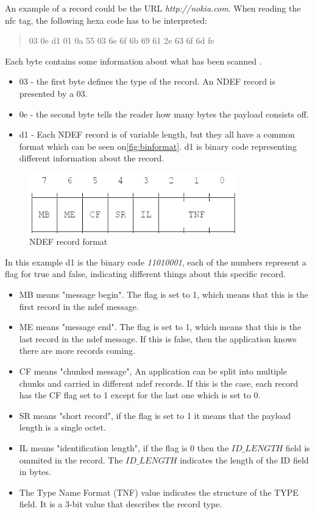 An example of a record could be the URL \textit{http://nokia.com}. When reading the \ac{nfc} tag, the following hexa code has to be interpreted: 

\begin{quote}
03 0e d1 01 0a 55 03 6e 6f 6b 69 61 2e 63 6f 6d fe
\end{quote}

Each byte contains some information about what has been scanned \citep{ndef}.

\begin{itemize}
\item 03 - the first byte defines the type of the record. An NDEF record is presented by a 03.
\item 0e - the second byte tells the reader how many bytes the payload consists off.
\item d1 - Each NDEF record is of variable length, but they all have a common format which can be seen on\autoref{fig:binformat}. d1 is binary code representing different information about the record.
\end{itemize}

\begin{figure}[H]
\centering
\includegraphics[width=0.8\textwidth]{img/binformat.png}
\caption{NDEF record format\citep{ndef}}
\label{fig:binformat}
\end{figure}

In this example d1 is the binary code \textit{11010001}, each of the numbers represent a flag for true and false, indicating different things about this specific record\citep{ndef}. 

\begin{itemize}
\item MB means "message begin". The flag is set to 1, which means that this is the first record in the \ac{ndef} message.
\item ME means "message end". The flag is set to 1, which means that this is the last record in the \ac{ndef} message. If this is false, then the application knows there are more records coming.
\item CF means "chunked message", An application can be split into multiple chunks and carried in different \ac{ndef} records. If this is the case, each record has the CF flag set to 1 except for the last one which is set to 0.
\item SR means "short record", if the flag is set to 1 it means that the payload length is a single octet. 
\item IL means "identification length", if the flag is 0 then the $ID\_LENGTH$ field is ommited in the record. The $ID\_LENGTH$ indicates the length of the ID field in bytes\citep{ndefformat}.
\item The Type Name Format (TNF) value indicates the structure of the TYPE field. It is a 3-bit value that describes the record type\citep{ndefformat}.
\end{itemize}

